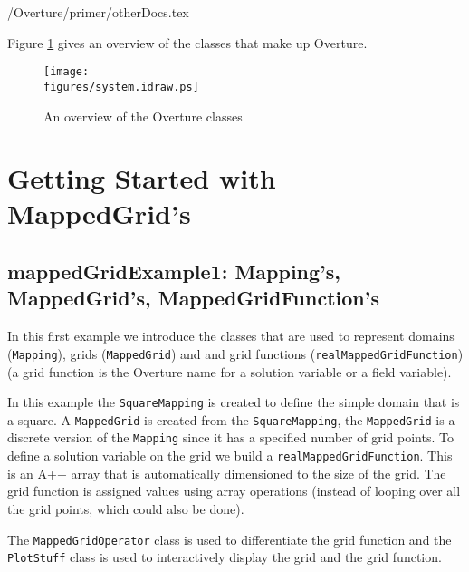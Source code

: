 \documentclass{article}
\begin{document}
 \homeHenshaw/Overture/primer/otherDocs.tex


Figure \ref{fig:system} gives an overview of the classes that make
up Overture. 


\begin{figure} \label{fig:system}
  \begin{center}
  \texttt{[image: \\figures/system.idraw.ps]}
  \caption{An overview of the Overture classes}
  \end{center}
\end{figure}

\vfill\eject
\section{Getting Started with MappedGrid's}

\subsection{mappedGridExample1: Mapping's, MappedGrid's, MappedGridFunction's}

In this first example we introduce the classes that are used to represent domains ({\tt Mapping}),
grids ({\tt MappedGrid}) and and grid functions ({\tt realMappedGridFunction})
(a grid function is the Overture name for a solution variable or a field variable).

In this example the {\tt SquareMapping} is created to define the simple domain that is a square.
A {\tt MappedGrid} is created from the {\tt SquareMapping}, the {\tt MappedGrid} is a discrete
version of the {\tt Mapping} since it has a specified number of grid points.
To define a solution variable on the grid we build a {\tt realMappedGridFunction}. This is an
A++ array that is automatically dimensioned to the size of the grid.
The grid function is assigned values using array operations (instead of looping over
all the grid points, which could also be done). 

The {\tt MappedGridOperator} class is used to differentiate the grid function and the 
{\tt PlotStuff} class is used to interactively display the grid and the grid function.
\end{document}
